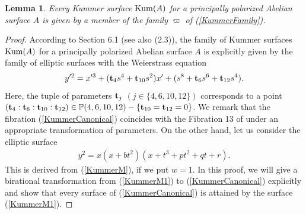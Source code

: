 \documentclass[10pt]{article}
\newtheorem{lem}{Lemma}[section]
\begin{document}
\begin{lem}\label{LemKum}
Every Kummer surface ${\rm Kum}(A)$ for a principally polarized Abelian surface $A$ is given by a member of the family $\varpi$ of (\ref{KummerFamily}).
\end{lem}

\begin{proof}
According to \cite{NS} Section 6.1 (see also \cite{NS} (2.3)),
the family of Kummer surfaces ${\rm Kum}(A)$ for a principally polarized Abelian surface $A$ is explicitly given by the family of elliptic surfaces with the Weierstrass equation
\begin{align}\label{KummerCanonical}
y'^2 = x'^3 +({\bf t}_4 s^4 +{\bf t}_{10} s^2) x' +(s^8 + {\bf t}_6 s^6 +{\bf t}_{12} s^4).
\end{align}
Here, the tuple of parameters ${\bf t}_j$ $(j \in \{4,6,10,12\})$ 
corresponds to  a point $({\bf t}_4:{\bf t}_6:{\bf t}_{10}:{\bf t}_{12}) \in \mathbb{P}(4,6,10,12)-\{{\bf t}_{10}={\bf t}_{12}=0\}$.
We remark that the fibration (\ref{KummerCanonical})  coincides with the Fibration 13 of \cite{Kumar} under an appropriate transformation of parameters.
On the other hand, let us consider the elliptic surface
\begin{align}\label{KummerM1}
y^2 = x(x+b t^2 ) (x+t^3 + p t^2 + q t  +r ).
\end{align}
This is derived from (\ref{KummerM}), if we put $w=1$. 
In this proof,
we will give a birational transformation from (\ref{KummerM1})  to (\ref{KummerCanonical}) explicitly
and show that every surface of (\ref{KummerCanonical}) is attained by the surface (\ref{KummerM1}).


\end{proof}
\end{document}
